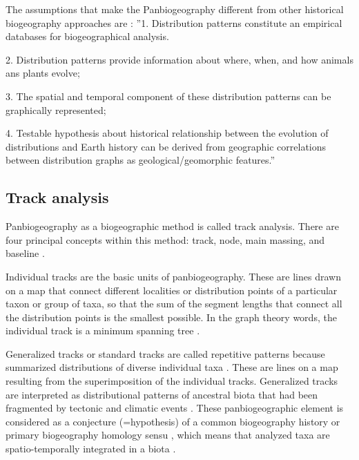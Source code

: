 The assumptions that make the Panbiogeography different from other historical
biogeography approaches are \citep[][:19]{Crawetal1999}:
''1. Distribution patterns constitute an empirical databases for biogeographical
analysis.

2. Distribution patterns provide information about where, when, and how animals
ans plants evolve;

3. The spatial and temporal component of these distribution patterns can be
graphically represented;

4. Testable hypothesis about historical relationship between the evolution of
distributions and Earth history can be derived from geographic correlations
between distribution graphs as geological/geomorphic features.''




\subsection{Track analysis}


Panbiogeography as a biogeographic method is called track analysis. There
are four principal concepts within this method: track, node, main massing, and
baseline \citep{CrisciMorrone1992a, Crawetal1999, Grehan2001a,
Espinosaetal2002}.

Individual tracks are the basic units of panbiogeography. These are lines drawn
on a map that connect different localities or distribution points of a
particular taxon or group of taxa, so that the sum of the segment lengths that
connect all the distribution points is the smallest possible. In the graph
theory words, the individual track is a minimum spanning tree
\citep{Crawetal1999, Morrone2004c, Page1987}.


Generalized tracks or standard tracks are called repetitive patterns because
summarized distributions of diverse individual taxa \citep{Michaux1989}. These
are lines on a map resulting from the superimposition of the individual tracks.
Generalized tracks are interpreted as distributional patterns of ancestral biota
that had been fragmented by tectonic and climatic events \citep{Craw1988}. These
panbiogeographic element is considered as a conjecture (=hypothesis) of a common biogeography
history or primary biogeography homology sensu  \citet{Morrone2001a}, which means
that analyzed taxa are spatio-temporally integrated in a biota \citep{Craw1983a,
Morrone2001a, Morrone2004c}.


